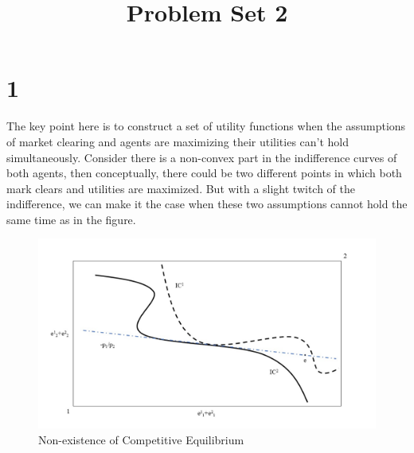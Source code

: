 \documentclass[12pt]{article}
\title{Problem Set 2}
\begin{document}
\maketitle


\section*{1}
The key point here is to construct a set of utility functions when the assumptions of market clearing and agents are maximizing their utilities can't hold simultaneously. Consider there is a non-convex part in the indifference curves of both agents, then conceptually, there could be two different points in which both mark clears and utilities are maximized. But with a slight twitch of the indifference, we can make it the case when these two assumptions cannot hold the same time as in the figure. 
\begin{figure}[h]
	\includegraphics[width=\linewidth]{1_fig.jpg}
	\centering
	\caption{Non-existence of Competitive Equilibrium}
\end{figure}
\end{document}
